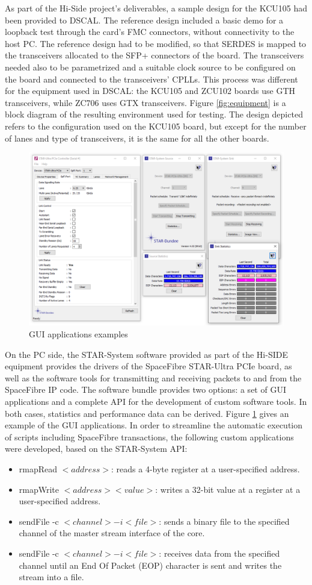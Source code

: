 As part of the Hi-Side project's deliverables, a sample design for the KCU105 had been provided to DSCAL. The reference design included a basic demo for a loopback test through the card's FMC connectors, without connectivity to the host PC. The reference design had to be modified, so that SERDES is mapped to the transceivers allocated to the SFP+ connectors of the board. The transceivers needed also to be parametrized and a suitable clock source to be configured on the board and connected to the transceivers' CPLLs. This process was different for the equipment used in DSCAL: the KCU105 and ZCU102 boards use GTH transceivers, while ZC706 uses GTX transceivers. Figure \ref{fig:equipment} is a block diagram of the resulting environment used for testing. The design depicted refers to the configuration used on the KCU105 board, but except for the number of lanes and type of transceivers, it is the same for all the other boards.\par
	\begin{figure}
		\centering
		\includegraphics[width=0.6\linewidth]{Figures/star-ultra_pcie_tx_and_rx.png}
		\caption{GUI applications examples}
		\label{fig:gui}
	\end{figure}
On the PC side, the STAR-System software provided as part of the Hi-SIDE equipment provides the drivers of the SpaceFibre STAR-Ultra PCIe board, as well as the software tools for transmitting and receiving packets to and from the SpaceFibre IP code. The software bundle provides two options: a set of GUI applications and a complete API for the development of custom software tools. In both cases, statistics and performance data can be derived. Figure \ref{fig:gui} gives an example of the GUI applications. In order to streamline the automatic execution of scripts including SpaceFibre transactions, the following custom applications were developed, based on the STAR-System API:
\begin{itemize}
    \item rmapRead $<address>$: reads a 4-byte register at a user-specified address.
    \item rmapWrite $<address> <value>$: writes a 32-bit value at a register at a user-specified address.
    \item sendFile -c $<channel> -i <file>$: sends a binary file to the specified channel of the master stream interface of the core.
    \item sendFile -c $<channel> -i <file>$: receives data from the specified channel until an End Of Packet (EOP) character is sent and writes the stream into a file.
\end{itemize}

